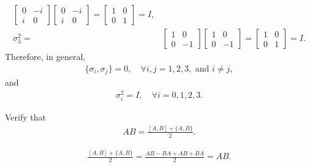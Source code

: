 \documentclass[en]{sol-man}
\begin{document}
\begin{pf}
\begin{align}
\begin{bmatrix}
            0&-i\\
            i&0
        \end{bmatrix}\begin{bmatrix}
            0&-i\\
            i&0
        \end{bmatrix}=\begin{bmatrix}
            1&0\\
            0&1
        \end{bmatrix}=I,\\
        \sigma_3^2=&\begin{bmatrix}
            1&0\\
            0&-1
        \end{bmatrix}\begin{bmatrix}
            1&0\\
            0&-1
        \end{bmatrix}=\begin{bmatrix}
            1&0\\
            0&1
        \end{bmatrix}=I.
    \end{align}
    Therefore, in general,
    \begin{align}
        \{\sigma_i,\sigma_j\}=0,\quad\forall i,j=1,2,3,\text{ and }i\neq j,
    \end{align}
    and
    \begin{align}
        \sigma_i^2=I,\quad\forall i=0,1,2,3.
    \end{align}
\end{pf}

\begin{exe}
    Verify that
    \begin{align}
        AB=\frac{[A,B]+\{A,B\}}{2}.
    \end{align}
\end{exe}
\begin{pf}
    \begin{align}
        \frac{[A,B]+\{A,B\}}{2}=\frac{AB-BA+AB+BA}{2}=AB.
    \end{align}
\end{pf}
\end{document}
